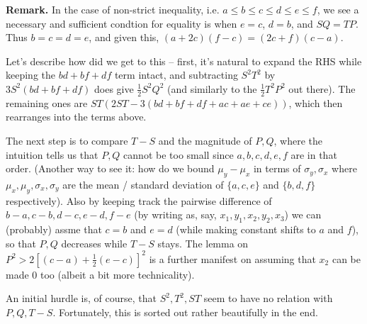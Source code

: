 \documentclass[11pt]{article}
\newcommand{\<}{\langle}
\renewcommand{\>}{\rangle}
\begin{document}
\begin{enumerate}
    \textbf{Remark.} 
    In the case of non-strict inequality, i.e. $a\le b\le c\le d\le e\le f$, we see a necessary and sufficient condtion for equality is when 
    $e = c$, $d = b$, and $SQ=TP$. 
    Thus $b=c=d=e$, and given this, $(a+2c)(f-c) = (2c+f)(c-a)$. 
    
    Let's describe how did we get to this -- first, it's natural to expand the RHS while keeping the $bd+bf+df$ term intact, 
    and subtracting $S^2T^2$ by $3S^2(bd+bf+df)$ does give $\frac 12S^2Q^2$ 
    (and similarly to the $\frac 12T^2P^2$ out there). 
    The remaining ones are $ST(2ST-3(bd + bf + df + ac + ae + ce))$, which then rearranges into the terms above. 
    
    The next step is to compare $T - S$ and the magnitude of $P, Q$, where the intuition tells us that $P, Q$ cannot be too small since $a,b,c,d,e,f$ are in that order. 
    (Another way to see it: how do we bound $\mu_y-\mu_x$ in terms of $\sigma_y, \sigma_x$ 
    where $\mu_x, \mu_y, \sigma_x,\sigma_y$ are the mean / standard deviation of 
    $\{a, c, e\}$ and $\{b, d, f\}$ respectively). 
    Also by keeping track the pairwise difference of $b-a, c-b, d-c, e-d, f-e$ (by writing as, say, $x_1, y_1, x_2, y_2, x_3$) we can (probably) assme that $c=b$ and $e=d$ (while making constant shifts to $a$ and $f$), so that $P, Q$ decreases while $T-S$ stays. 
    The lemma on $P^2 > 2[(c-a) + \frac12 (e-c)]^2$ is a further manifest on assuming that $x_2$ can be made 0 too 
    (albeit a bit more technicality). 
    
    An initial hurdle is, of course, that $S^2, T^2, ST$ seem to have no relation with $P, Q, T-S$. 
    Fortunately, this is sorted out rather beautifully in the end. 
    
\end{enumerate}
	
\end{document}
